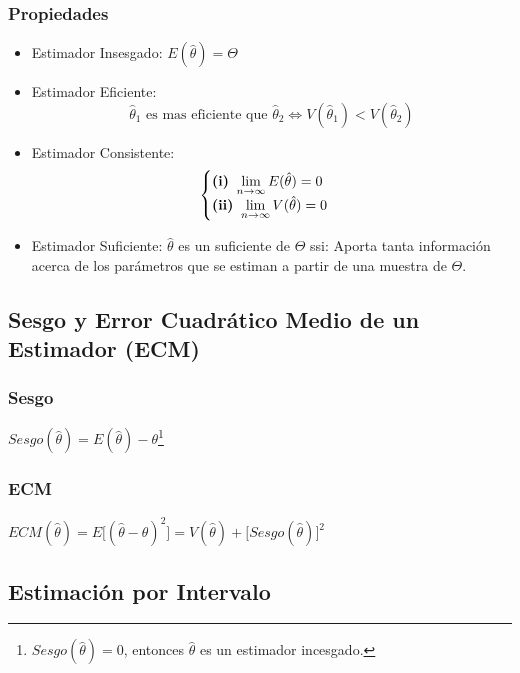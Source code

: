 \documentclass[10pt,letterpaper]{article}
\begin{document}
\subsubsection{Propiedades}
\begin{itemize}
\item Estimador Insesgado: $E(\hat{\theta}) = \Theta$
\item Estimador Eficiente: 
$$\hat{\theta}_1 \text{ es mas eficiente que } \hat{\theta}_2 \Leftrightarrow V(\hat{\theta}_1) < V(\hat{\theta}_2)$$
\item Estimador Consistente: 
$$
\begin{cases}
\text{\textbf{(i) }} \displaystyle\lim_{n\to\infty} E(\hat{\theta})=0 \\
\text{\textbf{(ii) }} \displaystyle\lim_{n\to\infty} V(\hat{\theta})=0 \\
\end{cases}
$$
\item Estimador Suficiente: $\hat{\theta}$ es un suficiente de $\Theta$ ssi: Aporta tanta información acerca de los parámetros que se estiman a partir de una muestra de $\Theta$.
\end{itemize}
\subsection{Sesgo y Error Cuadrático Medio de un Estimador (ECM)}
\begin{multicols}{2}
\subsubsection*{Sesgo}
\begin{center}
$Sesgo(\hat{\theta})= E(\hat{\theta}) - \theta$\footnote{$Sesgo(\widehat{\theta})=0$, entonces $\widehat{\theta}$ es un estimador incesgado.}
\end{center}
\columnbreak
\subsubsection*{ECM}
\begin{center}
$ECM(\hat{\theta}) = E\big[ (\hat{\theta}-\theta)^2 \big]=V(\hat{\theta}) + \Big[ Sesgo(\hat{\theta})\Big]^2$
\end{center}
\end{multicols}
\subsection{Estimación por Intervalo}
\end{document}
